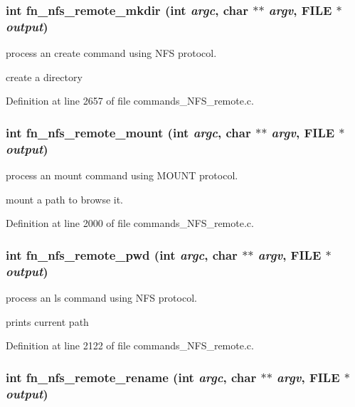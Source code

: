 \subsubsection[{fn\_\-nfs\_\-remote\_\-mkdir}]{\setlength{\rightskip}{0pt plus 5cm}int fn\_\-nfs\_\-remote\_\-mkdir (int {\em argc}, \/  char $\ast$$\ast$ {\em argv}, \/  FILE $\ast$ {\em output})}\label{commands_8h_2b93fc9c178407b8be3340c2d2b9463d}


process an create command using NFS protocol.

create a directory 

Definition at line 2657 of file commands\_\-NFS\_\-remote.c.
\subsubsection[{fn\_\-nfs\_\-remote\_\-mount}]{\setlength{\rightskip}{0pt plus 5cm}int fn\_\-nfs\_\-remote\_\-mount (int {\em argc}, \/  char $\ast$$\ast$ {\em argv}, \/  FILE $\ast$ {\em output})}\label{commands_8h_2fa932d8573b9d9cf1b25a1515750cfa}


process an mount command using MOUNT protocol.

mount a path to browse it. 

Definition at line 2000 of file commands\_\-NFS\_\-remote.c.
\subsubsection[{fn\_\-nfs\_\-remote\_\-pwd}]{\setlength{\rightskip}{0pt plus 5cm}int fn\_\-nfs\_\-remote\_\-pwd (int {\em argc}, \/  char $\ast$$\ast$ {\em argv}, \/  FILE $\ast$ {\em output})}\label{commands_8h_711fe3c372610defb306bfd74d66dca4}


process an ls command using NFS protocol.

prints current path 

Definition at line 2122 of file commands\_\-NFS\_\-remote.c.
\subsubsection[{fn\_\-nfs\_\-remote\_\-rename}]{\setlength{\rightskip}{0pt plus 5cm}int fn\_\-nfs\_\-remote\_\-rename (int {\em argc}, \/  char $\ast$$\ast$ {\em argv}, \/  FILE $\ast$ {\em output})}\label{commands_8h_385e00e4402183dcf9d7bbc6d17de3da}


